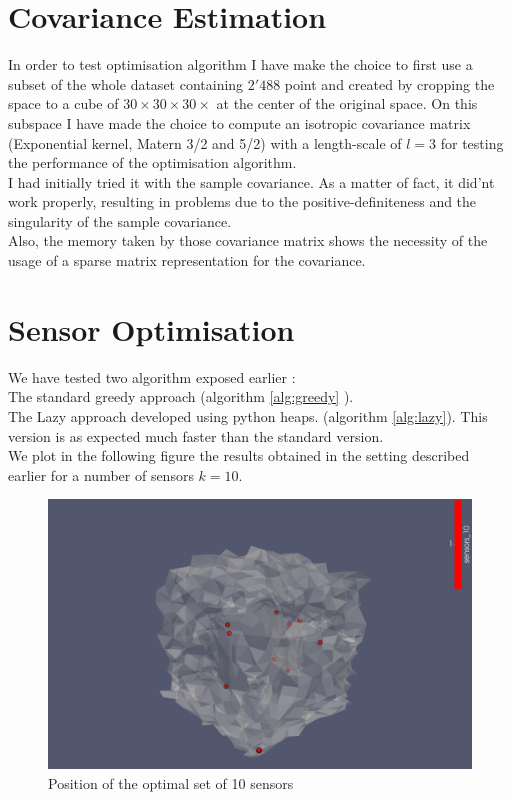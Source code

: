 \documentclass[12pt,twoside]{report}
\begin{document}
\section{Covariance Estimation}

In order to test optimisation algorithm I have make the choice to first use a subset of the whole dataset containing $2'488$ point and created by cropping the space to a cube of $30\times30\times30\times$ at the center of the original space. On  this subspace I have made the choice to compute an isotropic covariance matrix (Exponential kernel,  Matern 3/2 and 5/2) with a length-scale of $l=3$ for testing the performance of the optimisation algorithm. \\


I had initially tried it with the sample covariance. As a matter of fact, it did'nt work properly, resulting in problems due to the positive-definiteness and the singularity of the sample covariance. \\ 

Also, the memory taken by those covariance matrix shows the necessity of the usage of a sparse matrix representation for the covariance.  \\ 


\section{Sensor Optimisation}

We have tested two algorithm exposed earlier : \\
  
The standard greedy approach (algorithm \ref{alg:greedy} ). \\
The Lazy approach developed using python heaps. (algorithm \ref{alg:lazy}). This version is as expected much faster than the standard version.  \\ 

We plot in the following figure the results obtained in the setting described earlier for a number of sensors $k=10$. 

\begin{figure}[hbt]
  \includegraphics[width=\linewidth]{figures/SensorOpt/sensor10_matern52_15x15x30cube_1}
  \caption{Position of the optimal set of 10 sensors}
\end{figure}
\end{document}
